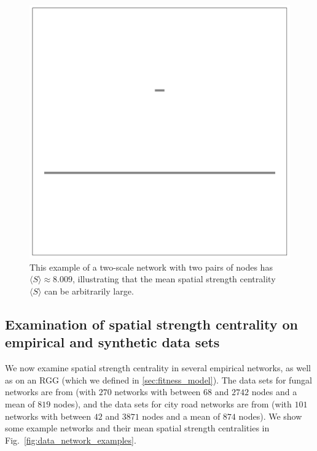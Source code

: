 \documentclass[%
 reprint,
 amsmath,amssymb,
 aps,
]{revtex4-1}
\begin{document}
\begin{figure}
    \centering
    \includegraphics[width=0.4\linewidth]{breaking_example_spatial_strength.pdf}
    \caption{This example of a two-scale network with two pairs of nodes has $\langle S \rangle \approx 8.009$, illustrating that the mean spatial strength centrality $\langle S \rangle$ can be arbitrarily large.
    }
    \label{fig:breaking_example}
\end{figure}




\subsection{Examination of spatial strength centrality on empirical and synthetic data sets}\label{data}

We now examine spatial strength centrality in several empirical networks, as well as on an RGG (which we defined in \ref{sec:fitness_model}).
The data sets for fungal networks are from \cite{fungal_data} (with $270$ networks with between $68$ and $2742$ nodes and a mean of $819$ nodes), and the data sets for city road networks are from \cite{road_data} (with $101$ networks with between $42$ and $3871$ nodes and a mean of $874$ nodes). We show some example networks and their mean spatial strength centralities in Fig.~\ref{fig:data_network_examples}.



\end{document}
